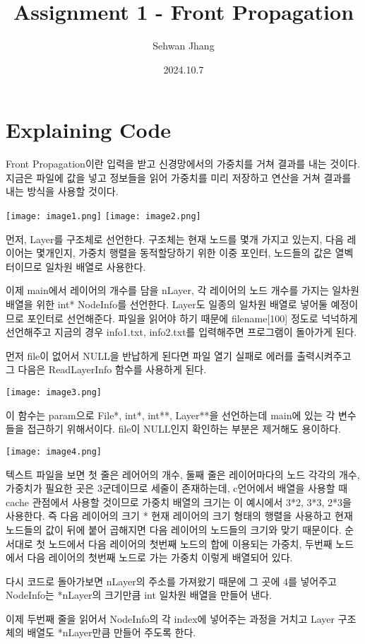 \documentclass[12pt,a4paper]{article}
\title{Assignment 1 - Front Propagation}
\author{Sehwan Jhang}
\date{2024.10.7}
\begin{document}
\section{Explaining Code}
Front Propagation이란 입력을 받고 신경망에서의 가중치를 거쳐 결과를 내는 것이다.
지금은 파일에 값을 넣고 정보들을 읽어 가중치를 미리 저장하고 연산을 거쳐 결과를 내는 방식을 사용할 것이다.

\texttt{[image: image1.png]}
\texttt{[image: image2.png]}

먼저, Layer를 구조체로 선언한다.
구조체는 현재 노드를 몇개 가지고 있는지, 다음 레이어는 몇개인지, 가중치 행렬을 동적할당하기 위한 이중 포인터,
노드들의 값은 열벡터이므로 일차원 배열로 사용한다.

이제 main에서 레이어의 개수를 담을 nLayer, 각 레이어의 노드 개수를 가지는 일차원 배열을 위한
int* NodeInfo를 선언한다.
Layer도 일종의 일차원 배열로 넣어둘 예정이므로 포인터로 선언해준다.
파일을 읽어야 하기 때문에 filename[100] 정도로 넉넉하게 선언해주고
지금의 경우 info1.txt, info2.txt를 입력해주면 프로그램이 돌아가게 된다.

먼저 file이 없어서 NULL을 반납하게 된다면 파일 열기 실패로 에러를 출력시켜주고
그 다음은 ReadLayerInfo 함수를 사용하게 된다.

\texttt{[image: image3.png]}

이 함수는 param으로 File*, int*, int**, Layer**을 선언하는데
main에 있는 각 변수들을 접근하기 위해서이다.
file이 NULL인지 확인하는 부분은 제거해도 용이하다.

\texttt{[image: image4.png]}

텍스트 파일을 보면 첫 줄은 레어어의 개수, 둘째 줄은 레이어마다의 노드 각각의 개수,
가중치가 필요한 곳은 3군데이므로 세줄이 존재하는데,
c언어에서 배열을 사용할 때 cache 관점에서 사용할 것이므로 
가중치 배열의 크기는 이 예시에서 3*2, 3*3, 2*3을 사용한다.
즉 다음 레이어의 크기 * 현재 레이어의 크기 형태의 행렬을 사용하고
현재 노드들의 값이 뒤에 붙어 곱해지면 다음 레이어의 노드들의 크기와 맞기 때문이다.
순서대로 첫 노드에서 다음 레이어의 첫번째 노드의 합에 이용되는 가중치,
두번째 노드에서 다음 레이어의 첫번째 노드로 가는 가중치 이렇게 배열되어 있다.

다시 코드로 돌아가보면 nLayer의 주소를 가져왔기 때문에 그 곳에 4를 넣어주고
NodeInfo는 *nLayer의 크기만큼 int 일차원 배열을 만들어 낸다.

이제 두번째 줄을 읽어서 NodeInfo의 각 index에 넣어주는 과정을 거치고
Layer 구조체의 배열도 *nLayer만큼 만들어 주도록 한다.
\end{document}
